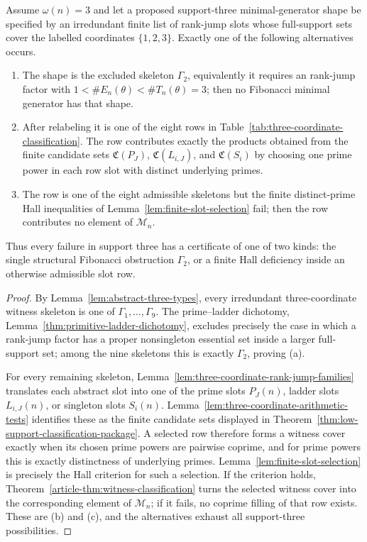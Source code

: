 \begin{corollary}
\label{cor:support-three-obstruction-certificates}
Assume $\omega(n)=3$ and let a proposed support-three minimal-generator shape be
specified by an irredundant finite list of rank-jump slots whose full-support sets
cover the labelled coordinates $\{1,2,3\}$.  Exactly one of the following
alternatives occurs.
\begin{enumerate}[label=(\alph*)]
\item The shape is the excluded skeleton $\Gamma_2$, equivalently it requires an
rank-jump factor with $1<\#E_n(\theta)<\#T_n(\theta)=3$; then no Fibonacci minimal
generator has that shape.
\item After relabeling it is one of the eight rows in
Table~\ref{tab:three-coordinate-classification}.  The row contributes exactly
the products obtained from the finite candidate sets
$\mathfrak C(P_J)$, $\mathfrak C(L_{i,J})$, and $\mathfrak C(S_i)$ by choosing
one prime power in each row slot with distinct underlying primes.
\item The row is one of the eight admissible skeletons but the finite
distinct-prime Hall inequalities of Lemma~\ref{lem:finite-slot-selection} fail;
then the row contributes no element of $\mathcal M_n$.
\end{enumerate}
Thus every failure in support three has a certificate of one of two kinds: the
single structural Fibonacci obstruction $\Gamma_2$, or a finite Hall deficiency
inside an otherwise admissible slot row.
\end{corollary}

\begin{proof}
By Lemma~\ref{lem:abstract-three-types}, every irredundant three-coordinate
witness skeleton is one of $\Gamma_1,\ldots,\Gamma_9$. The prime--ladder
dichotomy, Lemma~\ref{thm:primitive-ladder-dichotomy}, excludes precisely the
case in which a rank-jump factor has a proper nonsingleton essential set inside a larger
full-support set; among the nine skeletons this is exactly $\Gamma_2$, proving
(a).

For every remaining skeleton, Lemma~\ref{lem:three-coordinate-rank-jump-families}
translates each abstract slot into one of the prime slots $P_J(n)$, ladder
slots $L_{i,J}(n)$, or singleton slots $S_i(n)$.  Lemma~\ref{lem:three-coordinate-arithmetic-tests}
identifies these as the finite candidate sets displayed in
Theorem~\ref{thm:low-support-classification-package}.  A selected row therefore
forms a witness cover exactly when its chosen prime powers are pairwise
coprime, and for prime powers this is exactly distinctness of underlying primes.
Lemma~\ref{lem:finite-slot-selection} is precisely the Hall criterion for such a
selection.  If the criterion holds, Theorem~\ref{article-thm:witness-classification}
turns the selected witness cover into the corresponding element of
$\mathcal M_n$; if it fails, no coprime filling of that row exists.  These are
(b) and (c), and the alternatives exhaust all support-three possibilities.
\end{proof}

